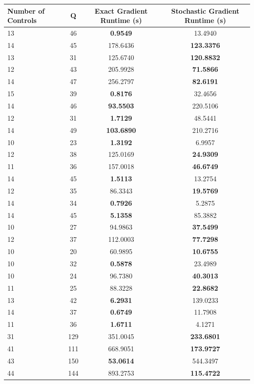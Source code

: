 \documentclass{article}
\begin{document}
\begin{table}[h]
\centering
\begin{tabular}{lccc}
\toprule
Number of Controls & Q & Exact Gradient Runtime (s) & Stochastic Gradient Runtime (s) \\
\midrule
13 & 46 & \textbf{0.9549} & 13.4940 \\
14 & 45 & 178.6436 & \textbf{123.3376} \\
13 & 31 & 125.6740 & \textbf{120.8832} \\
12 & 43 & 205.9928 & \textbf{71.5866} \\
14 & 47 & 256.2797 & \textbf{82.6191} \\
15 & 39 & \textbf{0.8176} & 32.4656 \\
14 & 46 & \textbf{93.5503} & 220.5106 \\
12 & 31 & \textbf{1.7129} & 48.5441 \\
14 & 49 & \textbf{103.6890} & 210.2716 \\
10 & 23 & \textbf{1.3192} & 6.9957 \\
12 & 38 & 125.0169 & \textbf{24.9309} \\
11 & 36 & 157.0018 & \textbf{46.6749} \\
14 & 45 & \textbf{1.5113} & 13.2754 \\
12 & 35 & 86.3343 & \textbf{19.5769} \\
14 & 34 & \textbf{0.7926} & 5.2875 \\
14 & 45 & \textbf{5.1358} & 85.3882 \\
10 & 27 & 94.9863 & \textbf{37.5499} \\
12 & 37 & 112.0003 & \textbf{77.7298} \\
10 & 20 & 60.9895 & \textbf{10.6755} \\
10 & 32 & \textbf{0.5878} & 23.4989 \\
10 & 24 & 96.7380 & \textbf{40.3013} \\
11 & 25 & 88.3228 & \textbf{22.8682} \\
13 & 42 & \textbf{6.2931} & 139.0233 \\
14 & 37 & \textbf{0.6749} & 11.7908 \\
11 & 36 & \textbf{1.6711} & 4.1271 \\
31 & 129 & 351.0045 & \textbf{233.6801} \\
41 & 111 & 668.9051 & \textbf{173.9727} \\
43 & 150 & \textbf{53.0614} & 544.3497 \\
44 & 144 & 893.2753 & \textbf{115.4722} \\

\end{tabular}
\end{table}
\end{document}
